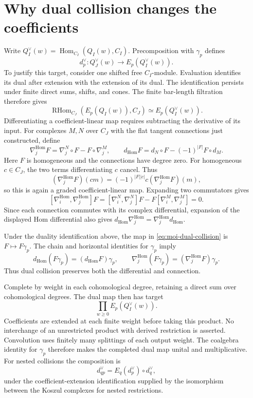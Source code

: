\section{Why dual collision changes the coefficients}

Write $Q_I^\vee(w)=\operatorname{Hom}_{C_I}(Q_I(w),C_I)$.
Precomposition with $\gamma_p$ defines
\begin{equation}\label{eq:moi-dual-collision}
 d_p^\vee:Q_J^\vee(w)\longrightarrow E_p(Q_I^\vee(w)).
\end{equation}
To justify this target, consider one shifted free $C_I$-module.
Evaluation identifies its dual after extension with the extension
of its dual. The identification persists under finite direct
sums, shifts, and cones.
The finite bar-length filtration therefore gives
\[
 \operatorname{RHom}_{C_J}(E_p(Q_I(w)),C_J)
 \simeq E_p(Q_I^\vee(w)).
\]
Differentiating a coefficient-linear map requires subtracting the
derivative of its input. For complexes $M,N$ over $C_J$ with the
flat tangent connections just constructed, define
\[
 \nabla_j^{\operatorname{Hom}}F
      =\nabla_j^N\circ F-F\circ\nabla_j^M,
 \qquad
 d_{\operatorname{Hom}}F=d_N\circ F-(-1)^{|F|}F\circ d_M.
\]
Here $F$ is homogeneous and the connections have degree zero.
For homogeneous $c\in C_J$, the two terms differentiating $c$
cancel. Thus
\[
 (\nabla_j^{\operatorname{Hom}}F)(cm)
       =(-1)^{|F||c|}c(\nabla_j^{\operatorname{Hom}}F)(m),
\]
so this is again a graded coefficient-linear map.
Expanding two commutators gives
\[
 [\nabla_i^{\operatorname{Hom}},\nabla_j^{\operatorname{Hom}}]F
   =[\nabla_i^N,\nabla_j^N]F-F[\nabla_i^M,\nabla_j^M]=0.
\]
Since each connection commutes with its complex differential,
expansion of the displayed Hom differential also gives
$d_{\operatorname{Hom}}\nabla_j^{\operatorname{Hom}}
 =\nabla_j^{\operatorname{Hom}}d_{\operatorname{Hom}}$.

Under the duality identification above, the map in
\eqref{eq:moi-dual-collision} is $F\mapsto F\gamma_p$.
The chain and horizontal identities for $\gamma_p$ imply
\[
 d_{\operatorname{Hom}}(F\gamma_p)
     =(d_{\operatorname{Hom}}F)\gamma_p,
 \qquad
 \nabla_j^{\operatorname{Hom}}(F\gamma_p)
     =(\nabla_j^{\operatorname{Hom}}F)\gamma_p.
\]
Thus dual collision preserves both the differential and connection.

Complete by weight in each cohomological degree, retaining a
direct sum over cohomological degrees.
The dual map then has target
\[
 \prod_{w\ge0} E_p(Q_I^\vee(w)).
\]
Coefficients are extended at each finite weight before taking
this product. No interchange of an unrestricted product with
derived restriction is asserted.
Convolution uses finitely many splittings of each output weight.
The coalgebra identity for $\gamma_p$ therefore makes the
completed dual map unital and multiplicative.
For nested collisions the composition is
\[
 d_{qp}^\vee=E_q(d_p^\vee)\circ d_q^\vee,
\]
under the coefficient-extension identification supplied by the
isomorphism between the Koszul complexes for nested restrictions.

